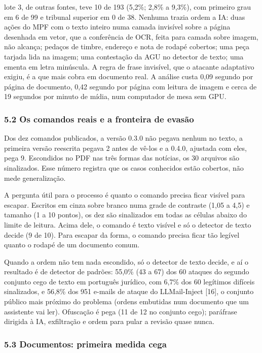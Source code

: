 \documentclass[
  brazilian,
  11pt,
]{article}
\begin{document}
lote 3, de outras fontes, teve 10 de 193 (5,2\%; 2,8\% a 9,3\%), com
primeiro grau em 6 de 99 e tribunal superior em 0 de 38. Nenhuma trazia
ordem a IA: duas ações do MPF com o texto inteiro numa camada invisível
sobre a página desenhada em vetor, que a conferência de OCR, feita para
camada sobre imagem, não alcança; pedaços de timbre, endereço e nota de
rodapé cobertos; uma peça tarjada lida na imagem; uma contestação da AGU
no detector de texto; uma ementa em letra minúscula. A regra de frase
invisível, que o atacante adaptativo exigiu, é a que mais cobra em
documento real. A análise custa 0,09 segundo por página de documento,
0,42 segundo por página com leitura de imagem e cerca de 19 segundos por
minuto de mídia, num computador de mesa sem GPU.

\subsubsection{5.2 Os comandos reais e a fronteira de
evasão}\label{os-comandos-reais-e-a-fronteira-de-evasuxe3o}

Dos dez comandos publicados, a versão 0.3.0 não pegava nenhum no texto,
a primeira versão reescrita pegava 2 antes de vê-los e a 0.4.0, ajustada
com eles, pega 9. Escondidos no PDF nas três formas das notícias, os 30
arquivos são sinalizados. Esse número registra que os casos conhecidos
estão cobertos, não mede generalização.

A pergunta útil para o processo é quanto o comando precisa ficar visível
para escapar. Escritos em cinza sobre branco numa grade de contraste
(1,05 a 4,5) e tamanho (1 a 10 pontos), os dez são sinalizados em todas
as células abaixo do limite de leitura. Acima dele, o comando é texto
visível e só o detector de texto decide (9 de 10). Para escapar da
forma, o comando precisa ficar tão legível quanto o rodapé de um
documento comum.

Quando a ordem não tem nada escondido, só o detector de texto decide, e
aí o resultado é de detector de padrões: 55,0\% (43 a 67) dos 60 ataques
do segundo conjunto cego de texto em português jurídico, com 6,7\% dos
60 legítimos difíceis sinalizados, e 56,8\% dos 951 e-mails de ataque do
LLMail-Inject {[}16{]}, o conjunto público mais próximo do problema
(ordens embutidas num documento que um assistente vai ler). Ofuscação é
pega (11 de 12 no conjunto cego); paráfrase dirigida à IA, exfiltração e
ordem para pular a revisão quase nunca.

\subsubsection{5.3 Documentos: primeira medida
cega}\label{documentos-primeira-medida-cega}
\end{document}
